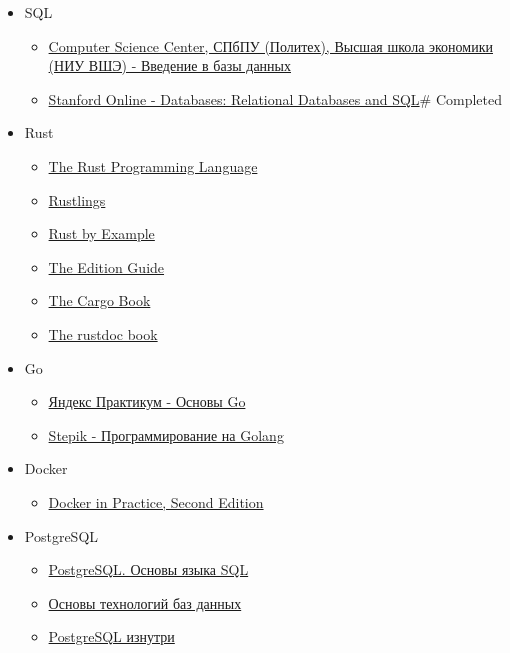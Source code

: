 \documentclass{article}
\begin{document}
\begin{itemize}
\item SQL\begin{itemize}
\item \href{https://stepik.org/course/551/info}{Computer Science Center, СПбПУ (Политех), Высшая школа экономики (НИУ ВШЭ) - Введение в базы данных}
\item \href{https://www.edx.org/course/databases-5-sql}{Stanford Online - Databases: Relational Databases and SQL}\# Completed
\end{itemize}

\item Rust\begin{itemize}
\item \href{https://doc.rust-lang.org/book/}{The Rust Programming Language}
\item \href{https://github.com/rust-lang/rustlings/}{Rustlings}
\item \href{https://doc.rust-lang.org/stable/rust-by-example/}{Rust by Example}
\item \href{https://doc.rust-lang.org/edition-guide/index.html}{The Edition Guide}
\item \href{https://doc.rust-lang.org/cargo/index.html}{The Cargo Book}
\item \href{https://doc.rust-lang.org/rustdoc/index.html}{The rustdoc book}
\end{itemize}

\item Go\begin{itemize}
\item \href{https://practicum.yandex.ru/go-basics/}{Яндекс Практикум - Основы Go}
\item \href{https://stepik.org/course/54403/info}{Stepik - Программирование на Golang}
\end{itemize}

\item Docker\begin{itemize}
\item \href{https://www.manning.com/books/docker-in-practice-second-edition?a_aid=zwischenzugs&a_bid=550032fc&source=post_page---------------------------}{Docker in Practice, Second Edition}
\end{itemize}

\item PostgreSQL\begin{itemize}
\item \href{https://postgrespro.ru/education/books/sqlprimer}{PostgreSQL. Основы языка SQL}
\item \href{https://postgrespro.ru/education/books/dbtech}{Основы технологий баз данных}
\item \href{https://postgrespro.ru/education/books/internals}{PostgreSQL изнутри}
\end{itemize}


\end{itemize}
\end{document}
